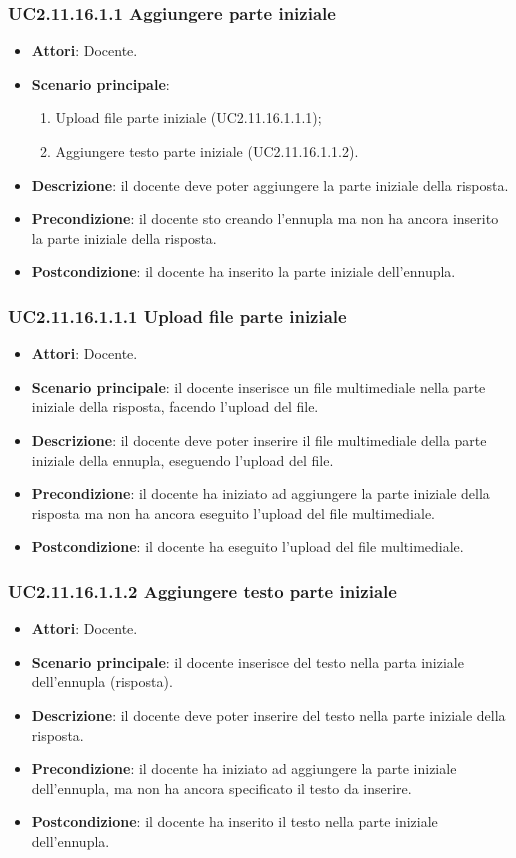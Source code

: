 \subsubsection{UC2.11.16.1.1 Aggiungere parte iniziale}
\begin{itemize}
\item \textbf{Attori}: Docente.
\item \textbf{Scenario principale}:
\begin{enumerate}
\item Upload file parte iniziale (UC2.11.16.1.1.1);
\item Aggiungere testo parte iniziale (UC2.11.16.1.1.2).
\end{enumerate}
\item \textbf{Descrizione}: il docente deve poter aggiungere la parte iniziale della risposta.
\item \textbf{Precondizione}: il docente sto creando l'ennupla ma non ha ancora inserito la parte iniziale della risposta.
\item \textbf{Postcondizione}: il docente ha inserito la parte iniziale dell'ennupla.
\end{itemize}
\subsubsection{UC2.11.16.1.1.1 Upload file parte iniziale}
\begin{itemize}
\item \textbf{Attori}: Docente.
\item \textbf{Scenario principale}: il docente inserisce un file multimediale nella parte iniziale della risposta, facendo l'upload del file.
\item \textbf{Descrizione}: il docente deve poter inserire il file multimediale della parte iniziale della ennupla, eseguendo l'upload del file.
\item \textbf{Precondizione}: il docente ha iniziato ad aggiungere la parte iniziale della risposta ma non ha ancora eseguito l'upload del file multimediale.
\item \textbf{Postcondizione}: il docente ha eseguito l'upload del file multimediale.
\end{itemize}
\subsubsection{UC2.11.16.1.1.2 Aggiungere testo parte iniziale}
\begin{itemize}
\item \textbf{Attori}: Docente.
\item \textbf{Scenario principale}: il docente inserisce del testo nella parta iniziale dell'ennupla (risposta).
\item \textbf{Descrizione}: il docente deve poter inserire del testo nella parte iniziale della risposta.
\item \textbf{Precondizione}: il docente ha iniziato ad aggiungere la parte iniziale dell'ennupla, ma non ha ancora specificato il testo da inserire.
\item \textbf{Postcondizione}: il docente ha inserito il testo nella parte iniziale dell'ennupla.
\end{itemize}
